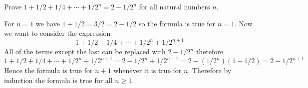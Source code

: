 
Prove $1+1/2+1/4+\cdots+1/2^n=2-1/2^n$ for all natural numbers $n$.

\medskip
For $n=1$ we have $1+1/2=3/2=2-1/2$ so the formula is true for $n=1$.
Now we want to consider the expression
$$1+1/2+1/4+\cdots+1/2^n+1/2^{n+1}$$
All of the terms except the last can be replaced with $2-1/2^n$ therefore
$$1+1/2+1/4+\cdots+1/2^n+1/2^{n+1}=2-1/2^n+1/2^{n+1}=2-(1/2^n)(1-1/2)
=2-1/2^{n+1}$$
Hence the formula is true for $n+1$ whenever it is true for $n$.
Therefore by induction the formula is true for all $n\ge1$.

